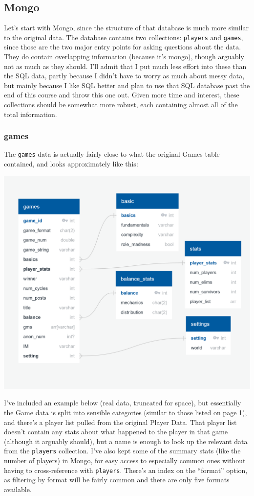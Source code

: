 \documentclass[11pt, oneside]{amsart}   	%
\begin{document}
\subsection{Mongo}

Let's start with Mongo, since the structure of that database is much more similar to the original data. The database contains two collections: \texttt{players} and \texttt{games}, since those are the two major entry points for asking questions about the data. They do contain overlapping information (because it's mongo), though arguably not as much as they should. I'll admit that I put much less effort into these than the SQL data, partly because I didn't have to worry as much about messy data, but mainly because I like SQL better and plan to use that SQL database past the end of this course and throw this one out. Given more time and interest, these collections should be somewhat more robust, each containing almost all of the total information. 


\subsubsection{games}
The \texttt{games} data is actually fairly close to what the original Games table contained, and looks approximately like this: 

\includegraphics[scale=0.5]{../mongo/mongo_games_v0.png}

I've included an example below (real data, truncated for space), but essentially the Game data is split into sensible categories (similar to those listed on page 1), and there's a player list pulled from the original Player Data. That player list doesn't contain any stats about what happened to the player in that game (although it arguably should), but a name is enough to look up the relevant data from the \texttt{players} collection. I've also kept some of the summary stats (like the number of players) in Mongo, for easy access to especially common ones without having to cross-reference with \texttt{players}. There's an index on the ``format'' option, as filtering by format will be fairly common and there are only five formats available. 
\end{document}
